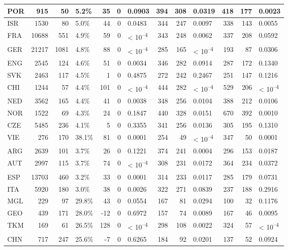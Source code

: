 \begin{tabular}{l|r|r|l|r|r|l|r|r|l|r|r|l}
\hline
POR & 915 & 50 & 5.2\% & 35 & 0 & 0.0903 & 394 & 308 & 0.0319 & 418 & 177 & 0.0023\\
\hline
ISR & 1530 & 80 & 5.0\% & 44 & 0 & 0.0483 & 344 & 247 & 0.0097 & 338 & 143 & 0.0055\\
\hline
FRA & 10688 & 551 & 4.9\% & 59 & 0 & < 10\textsuperscript{--4} & 343 & 248 & 0.0062 & 337 & 208 & 0.0592\\
\hline
GER & 21217 & 1081 & 4.8\% & 88 & 0 & < 10\textsuperscript{--4} & 285 & 165 & < 10\textsuperscript{--4} & 193 & 87 & 0.0306\\
\hline
ENG & 2545 & 124 & 4.6\% & 51 & 0 & 0.0034 & 346 & 282 & 0.0914 & 287 & 172 & 0.1340\\
\hline
SVK & 2463 & 117 & 4.5\% & 1 & 0 & 0.4875 & 272 & 242 & 0.2467 & 251 & 147 & 0.1216\\
\hline
CHI & 1244 & 57 & 4.4\% & 101 & 0 & < 10\textsuperscript{--4} & 444 & 282 & < 10\textsuperscript{--4} & 529 & 206 & < 10\textsuperscript{--4}\\
\hline
NED & 3562 & 165 & 4.4\% & 41 & 0 & 0.0038 & 348 & 256 & 0.0104 & 388 & 212 & 0.0106\\
\hline
NOR & 1522 & 69 & 4.3\% & 24 & 0 & 0.1847 & 440 & 328 & 0.0151 & 670 & 392 & 0.0010\\
\hline
CZE & 5485 & 236 & 4.1\% & 5 & 0 & 0.3355 & 341 & 256 & 0.0136 & 305 & 195 & 0.1310\\
\hline
VIE & 276 & 170 & 38.1\% & 81 & 0 & 0.0001 & 254 & 49 & < 10\textsuperscript{--4} & 347 & 50 & 0.0001\\
\hline
ARG & 2639 & 101 & 3.7\% & 26 & 0 & 0.1221 & 374 & 241 & 0.0004 & 296 & 153 & 0.0187\\
\hline
AUT & 2997 & 115 & 3.7\% & 74 & 0 & < 10\textsuperscript{--4} & 308 & 231 & 0.0172 & 364 & 234 & 0.0372\\
\hline
ESP & 13703 & 460 & 3.2\% & 33 & 0 & 0.0001 & 314 & 233 & 0.0117 & 285 & 179 & 0.0731\\
\hline
ITA & 5920 & 180 & 3.0\% & 38 & 0 & 0.0026 & 322 & 271 & 0.0839 & 237 & 188 & 0.2916\\
\hline
MGL & 229 & 97 & 29.8\% & 43 & 0 & 0.0554 & 167 & 81 & 0.0294 & 100 & 32 & 0.1176\\
\hline
GEO & 439 & 171 & 28.0\% & -12 & 0 & 0.6972 & 157 & 74 & 0.0089 & 167 & 46 & 0.0095\\
\hline
TKM & 169 & 61 & 26.5\% & 128 & 0 & < 10\textsuperscript{--4} & 298 & 108 & 0.0022 & 324 & 57 & < 10\textsuperscript{--4}\\
\hline
CHN & 717 & 247 & 25.6\% & -7 & 0 & 0.6265 & 184 & 92 & 0.0201 & 137 & 52 & 0.0924\\

\end{tabular}
